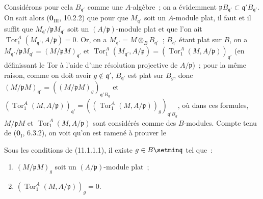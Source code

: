 Considérons pour cela $B_{\mathfrak q'}$ comme une $A$-algèbre~; on a
évidemment
$\mathfrak pB_{\mathfrak q'}\subset\mathfrak q'B_{\mathfrak q'}$. On sait
alors ($\mathbf 0_{\mathrm{III}}$, 10.2.2) que pour que $M_{\mathfrak q'}$ soit
un $A$-module plat, il faut et il suffit que
$M_{\mathfrak q'}/\mathfrak pM_{\mathfrak q'}$ soit un
$(A/\mathfrak p)$-module plat et que l'on ait
$\operatorname{Tor}_1^A(M_{\mathfrak q'},A/\mathfrak p)=0$. Or, on a
$M_{\mathfrak q'}=M\otimes_BB_{\mathfrak q'}$~; $B_{\mathfrak q'}$ étant plat
sur $B$, on a
$M_{\mathfrak q'}/\mathfrak pM_{\mathfrak q'}
  =(M/\mathfrak pM)_{\mathfrak q'}$
et
$\operatorname{Tor}_1^A(M_{\mathfrak q'},A/\mathfrak p)
  =(\operatorname{Tor}_1^A(M,A/\mathfrak p))_{\mathfrak q'}$
(en définissant le Tor à l'aide d'une résolution projective de
$A/\mathfrak p$)~; pour la même raison, comme on doit avoir
$g\notin\mathfrak q'$, $B_{\mathfrak q'}$ est plat sur $B_g$, donc
$(M/\mathfrak pM)_{\mathfrak q'}
  =((M/\mathfrak pM)_g)_{\mathfrak q'B_g}$
et
$(\operatorname{Tor}_1^A(M,A/\mathfrak p))_{\mathfrak q'}
  =((\operatorname{Tor}_1^A(M,A/\mathfrak p))_g)_{\mathfrak q'B_g}$,
où dans ces formules, $M/\mathfrak pM$ et
$\operatorname{Tor}_1^A(M,A/\mathfrak p)$ sont considérés comme des
$B$-modules. Compte tenu de ($\mathbf 0_{\mathrm I}$, 6.3.2), on voit qu'on
est ramené à prouver le

\begin{lemma}[11.1.1.2]
\label{IV.11.1.1.2-fr}
Sous les conditions de \textup{(11.1.1.1)}, il existe $g\in B\setmin\mathfrak q$ tel que~:
\begin{enumerate}[label=\textup{(\roman*)}]
  \item $(M/\mathfrak pM)_g$ soit un $(A/\mathfrak p)$-module plat~;
  \item $(\operatorname{Tor}_1^A(M,A/\mathfrak p))_g=0$.
\end{enumerate}
\end{lemma}


